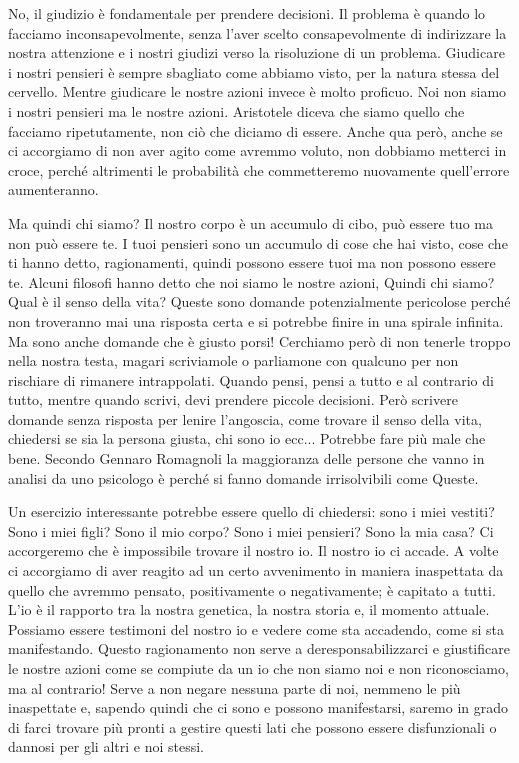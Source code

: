 \documentclass[12pt]{book} %
\begin{document}
No, il giudizio è fondamentale per prendere decisioni. Il problema è quando lo facciamo inconsapevolmente, senza
l'aver scelto consapevolmente di indirizzare la nostra attenzione e i nostri giudizi verso la
risoluzione di un problema. Giudicare i nostri pensieri è sempre sbagliato come abbiamo visto, per la natura stessa del
cervello. Mentre giudicare le nostre azioni invece è molto proficuo. Noi non siamo i nostri pensieri ma le nostre
azioni. Aristotele diceva che siamo quello che facciamo ripetutamente, non ciò che diciamo di essere. Anche qua però, anche se ci accorgiamo di non aver agito come avremmo voluto, non dobbiamo metterci in croce, perché altrimenti le probabilità che commetteremo nuovamente quell'errore aumenteranno. 

Ma quindi chi siamo? Il nostro corpo è un accumulo di cibo, può essere tuo ma non può essere te. I tuoi pensieri sono un
accumulo di cose che hai visto, cose che ti hanno detto, ragionamenti, quindi possono essere tuoi ma non possono essere
te. Alcuni filosofi hanno detto che noi siamo le nostre azioni, Quindi chi siamo? Qual è il senso della vita? Queste sono domande
potenzialmente pericolose perché non troveranno mai una risposta certa e si potrebbe finire in una spirale infinita. Ma
sono anche domande che è giusto porsi! Cerchiamo però di non tenerle troppo nella nostra testa, magari scriviamole o
parliamone con qualcuno per non rischiare di rimanere intrappolati. Quando pensi, pensi a tutto e al contrario di tutto, mentre quando scrivi, devi prendere piccole decisioni. Però scrivere domande senza risposta per lenire l'angoscia, come trovare il senso della vita, chiedersi se sia la persona giusta, chi sono io ecc... Potrebbe fare più male che bene. 
Secondo Gennaro Romagnoli la maggioranza delle persone che vanno in analisi da uno psicologo è perché si fanno domande irrisolvibili come Queste.

\bigskip

Un esercizio interessante potrebbe essere quello di
chiedersi: sono i miei vestiti? Sono i miei figli? Sono il mio corpo? Sono i miei pensieri? Sono la mia casa? Ci
accorgeremo che è impossibile trovare il nostro io. Il nostro io ci accade. A volte ci accorgiamo di aver reagito ad un
certo avvenimento in maniera inaspettata da quello che avremmo pensato, positivamente o negativamente; è capitato a
tutti. L'io è il rapporto tra la nostra genetica, la nostra storia e, il momento attuale. Possiamo
essere testimoni del nostro io e vedere come sta accadendo, come si sta manifestando. Questo ragionamento non serve a
deresponsabilizzarci e giustificare le nostre azioni come se compiute da un io che non siamo noi e non riconosciamo, ma
al contrario! Serve a non negare nessuna parte di noi, nemmeno le più inaspettate e, sapendo quindi che ci sono e
possono manifestarsi, saremo in grado di farci trovare più pronti a gestire questi lati che possono essere
disfunzionali o dannosi per gli altri e noi stessi.
\end{document}
